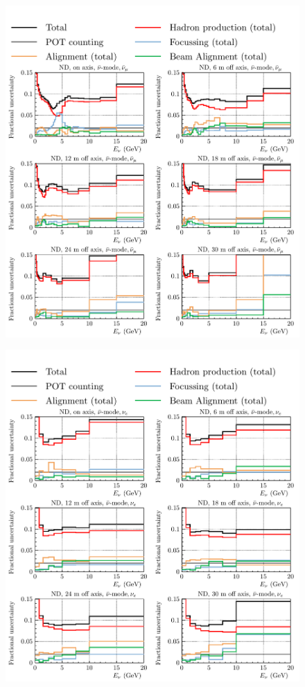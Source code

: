 \documentclass{article}
\begin{document}
\begin{figure}
  \includegraphics[width=\textwidth]{plots/fracerrs/nubarmode_numubar_ErrType_OffAxis}
  \caption{}
  \label{fig:grp_nubar_numubar_offaxis}
\end{figure}

\begin{figure}
  \includegraphics[width=\textwidth]{plots/fracerrs/nubarmode_nue_ErrType_OffAxis}
  \caption{}
  \label{fig:grp_nubar_nue_offaxis}
\end{figure}
\end{document}
